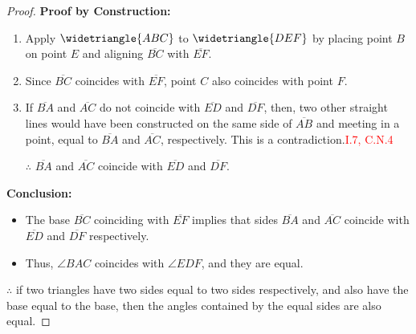 \begin{proof}

\textbf{Proof by Construction:}
\begin{enumerate}
  \item Apply $\widetriangle{ABC}$ to $\widetriangle{DEF}$ by placing point $B$ on point $E$ and aligning $\overline{BC}$ with $\overline{EF}$.
  
  \item Since $\overline{BC}$ coincides with $\overline{EF}$, point $C$ also coincides with point $F$.
  
  \item If $\overline{BA}$ and $\overline{AC}$ do not coincide with $\overline{ED}$ and $\overline{DF}$, then,  two other straight lines would have been constructed on the same side of $\overline{AB}$ and meeting in a point, equal to $\overline{BA}$ and $\overline{AC}$, respectively. This is a contradiction.\hfill\textcolor{red}{I.7, C.N.4}
  
  \item[$\therefore$] $\overline{BA}$ and $\overline{AC}$ coincide with $\overline{ED}$ and $\overline{DF}$.
\end{enumerate}

\clearpage

\begin{figure}[H]
	\caption{}
\end{figure}

\textbf{Conclusion:}
\begin{itemize}
  \item The base $\overline{BC}$ coinciding with $\overline{EF}$ implies that sides $\overline{BA}$ and $\overline{AC}$ coincide with $\overline{ED}$ and $\overline{DF}$ respectively.
  
  \item Thus, $\angle {BAC}$ coincides with $\angle{EDF}$, and they are equal.
\end{itemize}

$\therefore$ if two triangles have two sides equal to two sides respectively, and also have the base equal to the base, then the angles contained by the equal sides are also equal.

\end{proof}
 
 \clearpage
 
